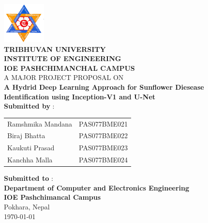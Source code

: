 \begin{center}
        
        \includegraphics[scale=0.8]{images/fav.png}\\
        \textbf{TRIBHUVAN UNIVERSITY \\[0.5mm]
        \large{INSTITUTE OF ENGINEERING} \\ [2mm]
        \Large{IOE PASHCHIMANCHAL CAMPUS}} \\[3cm]

       A MAJOR PROJECT PROPOSAL ON \\[0.8mm]
       \textbf{A Hydrid Deep Learning Approach for Sunflower Diesease Identification using Inception-V1 and U-Net} \\[3cm]
        \textbf{Submitted by} : \\[2mm]

        \begin{table}[h!]
                \centering
                \begin{tabular}{lc}
                
                Ramshmika Mandana & PAS077BME021 \\ 
                Biraj Bhatta      & PAS077BME022 \\
                Kaukuti Prasad    & PAS077BME023 \\
                Kanchha Malla     & PAS077BME024 \\ 
                \end{tabular}
                \end{table} 

        \vspace{4mm}
    
        \textbf{Submitted to} :\\
        \textbf{Department of Computer and Electronics Engineering \\
        IOE Pashchimancal Campus} \\
        Pokhara, Nepal \\[3cm]

        \today
\end{center}